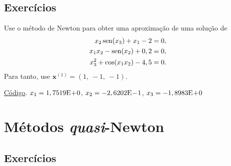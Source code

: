 \subsection*{Exercícios}

\begin{exer}\label{ex:newton_exec}
  Use o método de Newton para obter uma aproximação de uma solução de
  \begin{align}
    x_2\operatorname{sen}(x_3)+x_1-2&=0,\\
    x_1x_2-\operatorname{sen}(x_2)+0,2&=0,\\
    x_3^2+\cos(x_1x_2)-4,5&=0.
  \end{align}
Para tanto, use $\pmb{x}^{(1)} = (1,~-1,~-1)$.
\end{exer}
\begin{resp}
    \ifisoctave 
    \href{https://github.com/phkonzen/notas/blob/master/src/MatematicaNumerica/cap_snl/dados/exer_newton_exec/exer_newton_exec.m}{Código}. 
  \fi
  $x_1 = 1,7519\mathrm{E}\!+\!0$, $x_2 = -2,6202\mathrm{E}\!-\!1$, $x_3 =-1,8983\mathrm{E}\!+\!0$
\end{resp}



\section{Métodos {\it quasi}-Newton}\label{cap_snl_sec_quasi_newton}

\emconstrucao

\subsection*{Exercícios}

\emconstrucao